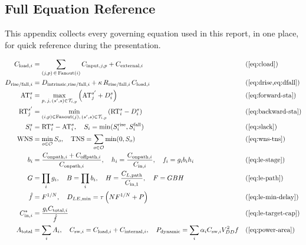 \begin{appendices}

\chapter{Full Equation Reference}
\label{app:equations}

This appendix collects every governing equation used in this report, in
one place, for quick reference during the presentation.

\begin{align*}
    C_{\mathrm{load},i} &= \sum_{(j,p)\,\in\,\mathrm{Fanout}(i)} C_{\mathrm{input},j,p} + C_{\mathrm{external},i} & &\text{(\cref{eq:cload})}\\
    D_{\mathrm{rise}/\mathrm{fall},i} &= D_{\mathrm{intrinsic},\mathrm{rise}/\mathrm{fall},i} + \kappa\, R_{\mathrm{rise}/\mathrm{fall},i}\, C_{\mathrm{load},i} & &\text{(\cref{eq:drise,eq:dfall})}\\
    \mathrm{AT}_i^{s} &= \max_{p,\,j,\,(s',s)\in\mathcal{T}_{i,p}} \left(\mathrm{AT}_j^{s'} + D_i^{s}\right) & &\text{(\cref{eq:forward-sta})}\\
    \mathrm{RT}_j^{s'} &= \min_{(i,p)\in\mathrm{Fanout}(j),\,(s',s)\in\mathcal{T}_{i,p}} \left(\mathrm{RT}_i^{s} - D_i^{s}\right) & &\text{(\cref{eq:backward-sta})}\\
    S_i^{s} &= \mathrm{RT}_i^{s} - \mathrm{AT}_i^{s}, \quad S_i = \min(S_i^{\mathrm{rise}}, S_i^{\mathrm{fall}}) & &\text{(\cref{eq:slack})}\\
    \mathrm{WNS} &= \min_{o\in\mathcal{O}} S_o, \quad \mathrm{TNS} = \sum_{o\in\mathcal{O}} \min(0,S_o) & &\text{(\cref{eq:wns-tns})}\\
    b_i &= \frac{C_{\mathrm{onpath},i}+C_{\mathrm{offpath},i}}{C_{\mathrm{onpath},i}}, \quad h_i = \frac{C_{\mathrm{onpath},i}}{C_{\mathrm{in},i}}, \quad f_i = g_i b_i h_i & &\text{(\cref{eq:le-stage})}\\
    G &= \prod_i g_i, \quad B = \prod_i b_i, \quad H = \frac{C_{L,\mathrm{path}}}{C_{\mathrm{in},1}}, \quad F = GBH & &\text{(\cref{eq:le-path})}\\
    \hat f &= F^{1/N}, \quad D_{LE,\mathrm{min}} = \tau\left(NF^{1/N}+P\right) & &\text{(\cref{eq:le-min-delay})}\\
    C^{*}_{\mathrm{in},i} &= \frac{g_i C_{\mathrm{total},i}}{\hat f} & &\text{(\cref{eq:le-target-cap})}\\
    A_{\mathrm{total}} &= \sum_i A_i, \quad C_{\mathrm{sw},i} = C_{\mathrm{load},i}+C_{\mathrm{internal},i}, \quad P_{\mathrm{dynamic}} = \sum_i \alpha_i C_{\mathrm{sw},i} V_{DD}^2 f & &\text{(\cref{eq:power-area})}\\

\end{align*}
\end{appendices}
